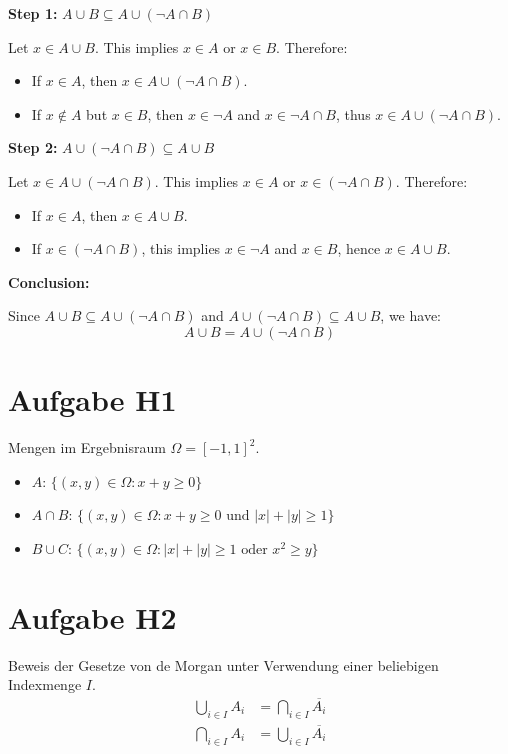 \documentclass{article}
\begin{document}
\textbf{Step 1:} \( A \cup B \subseteq A \cup (\neg A \cap B) \)

Let \( x \in A \cup B \). This implies \( x \in A \) or \( x \in B \). Therefore:
\begin{itemize}
  \item If \( x \in A \), then \( x \in A \cup (\neg A \cap B) \).
  \item If \( x \notin A \) but \( x \in B \), then \( x \in \neg A \) and \( x \in \neg A \cap B \), thus \( x \in A \cup (\neg A \cap B) \).
\end{itemize}

\textbf{Step 2:} \( A \cup (\neg A \cap B) \subseteq A \cup B \)

Let \( x \in A \cup (\neg A \cap B) \). This implies \( x \in A \) or \( x \in (\neg A \cap B) \). Therefore:
\begin{itemize}
  \item If \( x \in A \), then \( x \in A \cup B \).
  \item If \( x \in (\neg A \cap B) \), this implies \( x \in \neg A \) and \( x \in B \), hence \( x \in A \cup B \).
\end{itemize}

\textbf{Conclusion:}

Since \( A \cup B \subseteq A \cup (\neg A \cap B) \) and \( A \cup (\neg A \cap B) \subseteq A \cup B \), we have:
\[ A \cup B = A \cup (\neg A \cap B) \]

\section*{Aufgabe H1}
Mengen im Ergebnisraum $\Omega = [-1, 1]^2$.
\begin{itemize}
    \item $A$: $\{(x, y) \in \Omega : x + y \geq 0\}$
    \item $A \cap B$: $\{(x, y) \in \Omega : x + y \geq 0 \text{ und } |x| + |y| \geq 1\}$
    \item $B \cup C$: $\{(x, y) \in \Omega : |x| + |y| \geq 1 \text{ oder } x^2 \geq y\}$
\end{itemize}

\section*{Aufgabe H2}
Beweis der Gesetze von de Morgan unter Verwendung einer beliebigen Indexmenge $I$.
\begin{align*}
    \bigcup_{i \in I} A_i &= \bigcap_{i \in I} \overline{A_i} \\
    \bigcap_{i \in I} A_i &= \bigcup_{i \in I} \overline{A_i}
\end{align*}
\end{document}
